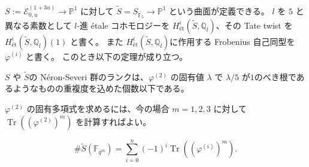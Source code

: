 \documentclass{classes/mybeamer}
\DeclareMathOperator{\Tr}{Tr}
\newcommand{\Neron}{N\'eron}
\begin{document}
\begin{frame}
    $S:=\mathcal{E}_{0,u}^{(1 + 3u)}\to \mathbb{P}^{1}$ に対して $\tilde{S} = S_{\overline{\mathbb{F}_5}} \to \mathbb{P}^1$ という曲面が定義できる。
    $l$ を $5$ と異なる素数として $l$-進 \'etale コホモロジーを $H^{i}_{\text{\'et}}(\tilde{S}, \mathbb{Q}_l)$、その Tate twist を $H^{i}_{\text{\'et}}(\tilde{S}, \mathbb{Q}_l)(1)$ と書く。
    また $H^{i}_{\text{\'et}}(\tilde{S}, \mathbb{Q}_l)$に作用する Frobenius 自己同型を $\varphi^{(i)}$ と書く。
    このとき以下の定理が成り立つ。
    \begin{thm}
        \label{cor:ns_upper_bound}
        $S$ や $\tilde{S}$の \Neron-Severi 群のランクは、$\varphi^{(2)}$ の固有値 $\lambda$ で $\lambda/5$ が$1$のべき根であるようなものの重複度を込めた個数以下である。
    \end{thm}
    $\varphi^{(2)}$ の固有多項式を求めるには、今の場合 $m=1,2,3$ に対して $\Tr((\varphi^{(2)})^m)$ を計算すればよい。
    \begin{thm}
        \begin{equation*}
            \# \tilde{S}(\mathbb{F}_{q^{m}}) = \sum_{i = 0}^{n} ( - 1)^{i} \Tr((\varphi^{(i)})^{m}).
        \end{equation*}
    \end{thm}
\end{frame}
\end{document}
